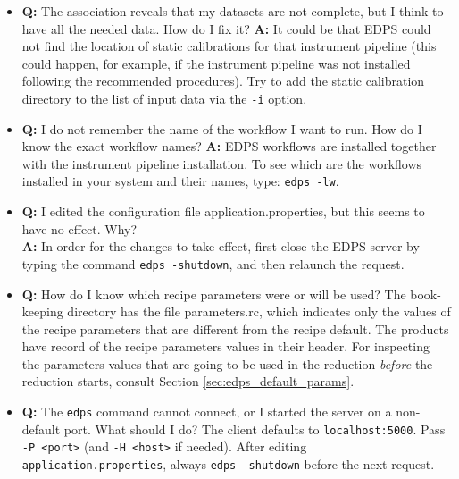 \begin{itemize}
    \item {\bf Q:} The association reveals that my datasets are not complete, but I think to have all the needed data. How do I fix it?\newline
    {\bf A:} It could be that EDPS could not find the location of static calibrations for that instrument pipeline (this could happen, for example, if the instrument pipeline was not installed following the recommended procedures). Try to add the static calibration directory to the list of input data via the {\tt -i} option.
      \item {\bf Q:} I do not remember the name of the workflow I want to run. How do I know the exact workflow names? 
      \newline
    {\bf A:} EDPS workflows are installed together with the instrument pipeline installation. To see which are the workflows installed in your system and their names, type: {\tt edps -lw}. 
    \item {\bf Q:} I edited the configuration file application.properties, but this seems to have no effect. Why?\\
    {\bf A:} In order for the changes to take effect, first close the EDPS server by typing the command {\tt edps -shutdown}, and then relaunch the request.
    \item{\bf Q:} How do I know which recipe parameters were or will be used?
     The book-keeping directory has the file parameters.rc, which indicates only the values of the recipe parameters that are different from the recipe default. The products have record of the recipe parameters values in their header. For inspecting the parameters values that are going to be used in the reduction {\it before} the reduction starts, consult Section \ref{sec:edps_default_params}.
    \item {\bf Q:} The {\tt edps} command cannot connect, or I started the server on a non-default port. What should I do?
     The client defaults to {\tt localhost:5000}. Pass {\tt -P <port>} (and {\tt -H <host>} if needed). After editing {\tt application.properties}, always {\tt edps --shutdown} before the next request.
\end{itemize}